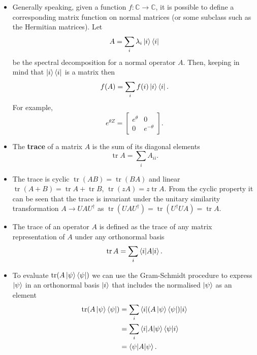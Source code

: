 \documentclass{article}
\newcommand{\tr}{\operatorname{tr}}
\begin{document}
\begin{itemize}
  \item Generally speaking, given a function $f : \mathbb{C} \rightarrow \mathbb{C}$, it is possible to define a corresponding matrix function on normal matrices (or some subclass such as the Hermitian matrices). Let \[A = \sum_i \lambda_i \ket{i} \bra{i}\] be the spectral decomposition for a normal operator $A$. Then, keeping in mind that $\ket{i} \bra{i}$ is a matrix then \[f(A) = \sum_i f(i) \ket{i} \bra{i}.\] For example, \[e^{\theta Z} = \begin{bmatrix}
            e^\theta & 0           \\
            0        & e^{-\theta}
          \end{bmatrix}.\]

  \item The \textbf{trace} of a matrix $A$ is the sum of its diagonal elements \[\tr A = \sum_i A_{i i}.\]

  \item The trace is cyclic $\tr (A B) = \tr (B A)$ and linear $\tr (A + B) = \tr A + \tr B$, $\tr (z A) = z \tr A$. From the cyclic property it can be seen that the trace is invariant under the unitary similarity transformation $A \rightarrow U A U^\dag$ as $\tr (U A U^\dag) = \tr (U^\dag U A) = \tr A$.

  \item The trace of an operator $A$ is defined as the trace of any matrix representation of $A$ under any orthonormal basis \[\tr A = \sum_i \braket{i | A | i}.\]

  \item To evaluate $\tr (A \ket{\psi} \bra{\psi})$ we can use the Gram-Schmidt procedure to express $\ket{\psi}$ in an orthonormal basis $\ket{i}$ that includes the normalised $\ket{\psi}$ as an element \begin{align*}
          \tr (A \ket{\psi} \bra{\psi}) & = \sum_i \braket{i | (A \ket{\psi} \bra{\psi}) | i} \\
                                        & = \sum_i \braket{i | A | \psi} \braket{\psi | i}    \\
                                        & = \braket{\psi | A | \psi}.
        \end{align*}
\end{itemize}
\end{document}
